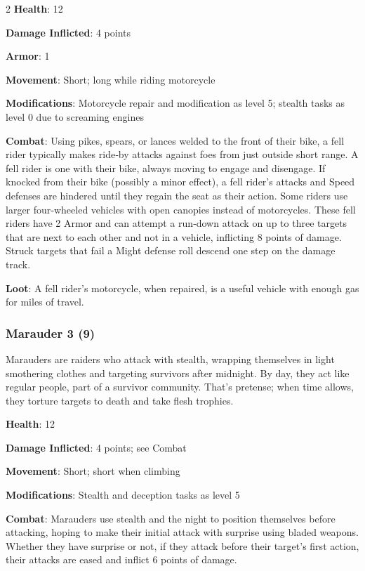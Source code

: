 \begin{multicols}{2}
\textbf{Health}: 12

\textbf{Damage Inflicted}: 4 points

\textbf{Armor}: 1

\textbf{Movement}: Short; long while riding motorcycle

\textbf{Modifications}: Motorcycle repair and modification as level 5; stealth tasks as level 0 due to screaming engines

\textbf{Combat}: Using pikes, spears, or lances welded to the front of their bike, a fell rider typically makes ride‑by attacks against foes from just outside short range. A fell rider is one with their bike, always moving to engage and disengage. If knocked from their bike (possibly a minor effect), a fell rider’s attacks and Speed defenses are hindered until they regain the seat as their action. Some riders use larger four‑wheeled vehicles with open canopies instead of motorcycles. These fell riders have 2 Armor and can attempt a run‑down attack on up to three targets that are next to each other and not in a vehicle, inflicting 8 points of damage. Struck targets that fail a Might defense roll descend one step on the damage track.

\textbf{Loot}: A fell rider’s motorcycle, when repaired, is a useful vehicle with enough gas for miles of travel.

\subsubsection{Marauder 3 (9)}

Marauders are raiders who attack with stealth, wrapping themselves in light smothering clothes and targeting survivors after midnight. By day, they act like regular people, part of a survivor community. That’s pretense; when time allows, they torture targets to death and take flesh trophies.

\textbf{Health}: 12 

\textbf{Damage Inflicted}: 4 points; see Combat 

\textbf{Movement}: Short; short when climbing 

\textbf{Modifications}: Stealth and deception tasks as level 5 

\textbf{Combat}: Marauders use stealth and the night to position themselves before attacking, hoping to make their initial attack with surprise using bladed weapons. Whether they have surprise or not, if they attack before their target’s first action, their attacks are eased and inflict 6 points of damage. 


\end{multicols}
